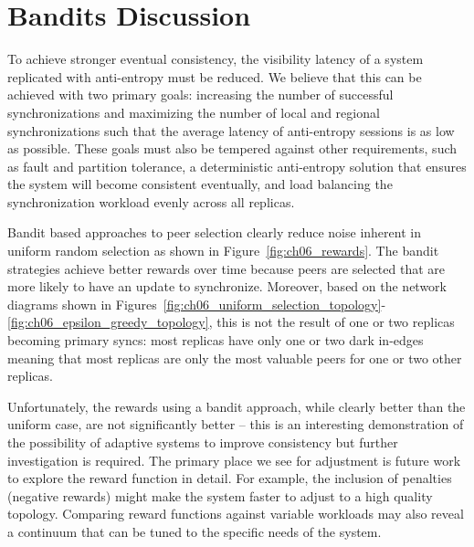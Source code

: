 \section{Bandits Discussion}

To achieve stronger eventual consistency, the visibility latency
of a system replicated with anti-entropy must be reduced.
We believe that this can be achieved with two primary goals: increasing
the number of successful synchronizations and maximizing the number
of local and regional synchronizations such that the average latency of
anti-entropy sessions is as low as possible.
These goals must also be tempered against other requirements, such as
fault and partition tolerance, a deterministic anti-entropy solution that
ensures the system will become consistent eventually, and load balancing
the synchronization workload evenly across all replicas.

Bandit based approaches to peer selection clearly reduce noise inherent
in uniform random selection as shown in Figure~\ref{fig:ch06_rewards}.
The bandit strategies achieve better rewards over time because peers
are selected that are more likely to have an update to synchronize.
Moreover, based on the network diagrams shown in
Figures~\ref{fig:ch06_uniform_selection_topology}-\ref{fig:ch06_epsilon_greedy_topology}, this is
not the result of one or two replicas becoming primary syncs: most
replicas have only one or two dark in-edges meaning that most replicas
are only the most valuable peers for one or two other replicas.

Unfortunately, the rewards using a bandit approach, while clearly better
than the uniform case, are not significantly better -- this is an interesting
demonstration of the possibility of adaptive systems to improve consistency
but further investigation is required.
The primary place we see for adjustment is future work to explore the reward
function in detail.
For example, the inclusion of penalties (negative rewards) might make
the system faster to adjust to a high quality topology.
Comparing reward functions against variable workloads may also reveal a
continuum that can be tuned to the specific needs of the system.

